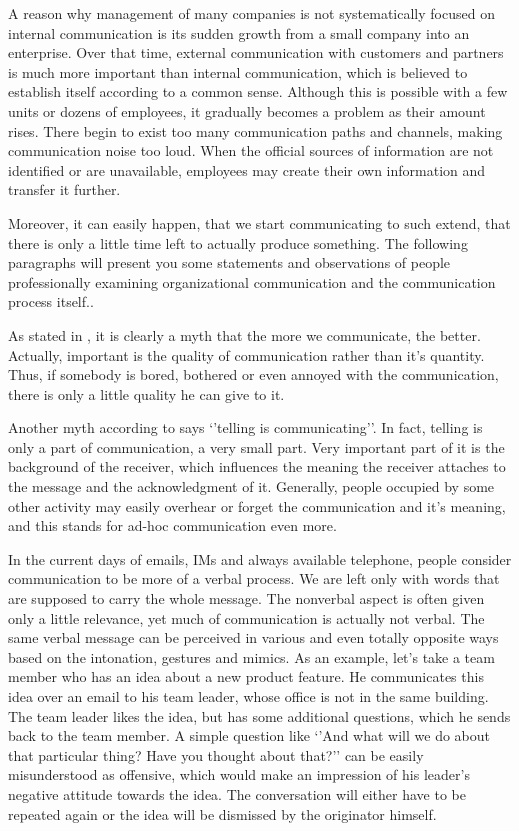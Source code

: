 \documentclass[11pt,singleside]{myfithesis2}
\begin{document}
A reason why management of many companies is not systematically focused on internal communication is its sudden growth from a small company into an enterprise. Over that time, external communication with customers and partners is much more important than internal communication, which is believed to establish itself according to a common sense. Although this is possible with a few units or dozens of employees, it gradually becomes a problem as their amount rises. There begin to exist too many communication paths and channels, making communication noise too loud. When the official sources of information are not identified or are unavailable, employees may create their own information and transfer it further.

Moreover, it can easily happen, that we start communicating to such extend, that there is only a little time left to actually produce something. The following paragraphs will present you some statements and observations of people professionally examining organizational communication and the communication process itself..

As stated in \cite{orgCommForSurvival}, it is clearly a myth that the more we communicate, the better. Actually, important is the quality of communication rather than it's quantity. Thus, if somebody is bored, bothered or even annoyed with the communication, there is only a little quality he can give to it.

Another myth according to \cite{orgCommForSurvival} says `'telling is communicating''. In fact, telling is only a part of communication, a very small part. Very important part of it is the background of the receiver, which influences the meaning the receiver attaches to the message and the acknowledgment of it. Generally, people occupied by some other activity may easily overhear or forget the communication and it's meaning, and this stands for ad-hoc communication even more.

In the current days of emails, IMs and always available telephone, people consider communication to be more of a verbal process. We are left only with words that are supposed to carry the whole message. The nonverbal aspect is often given only a little relevance, yet much of communication is actually not verbal. The same verbal message can be perceived in various and even totally opposite ways based on the intonation, gestures and mimics. As an example, let's take a team member who has an idea about a new product feature. He communicates this idea over an email to his team leader, whose office is not in the same building. The team leader likes the idea, but has some additional questions, which he sends back to the team member. A simple question like `'And what will we do about that particular thing? Have you thought about that?'' can be easily misunderstood as offensive, which would make an impression of his leader's negative attitude towards the idea. The conversation will either have to be repeated again or the idea will be dismissed by the originator himself.
\end{document}
